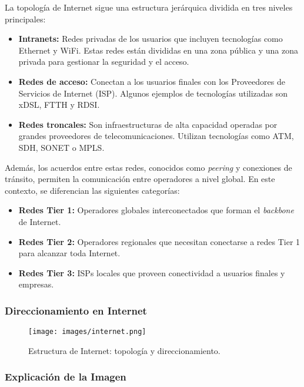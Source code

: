 \documentclass[a4paper,12pt]{article}
\begin{document}
La topología de Internet sigue una estructura jerárquica dividida en tres niveles principales:
\begin{itemize}
    \item \textbf{Intranets:} Redes privadas de los usuarios que incluyen tecnologías como Ethernet y WiFi. Estas redes están divididas en una zona pública y una zona privada para gestionar la seguridad y el acceso.
    \item \textbf{Redes de acceso:} Conectan a los usuarios finales con los Proveedores de Servicios de Internet (ISP). Algunos ejemplos de tecnologías utilizadas son xDSL, FTTH y RDSI.
    \item \textbf{Redes troncales:} Son infraestructuras de alta capacidad operadas por grandes proveedores de telecomunicaciones. Utilizan tecnologías como ATM, SDH, SONET o MPLS.
\end{itemize}

Además, los acuerdos entre estas redes, conocidos como \textit{peering} y conexiones de tránsito, permiten la comunicación entre operadores a nivel global. En este contexto, se diferencian las siguientes categorías:
\begin{itemize}
    \item \textbf{Redes Tier 1:} Operadores globales interconectados que forman el \textit{backbone} de Internet.
    \item \textbf{Redes Tier 2:} Operadores regionales que necesitan conectarse a redes Tier 1 para alcanzar toda Internet.
    \item \textbf{Redes Tier 3:} ISPs locales que proveen conectividad a usuarios finales y empresas.
\end{itemize}

\subsubsection{Direccionamiento en Internet}

\begin{figure}[H]
    \centering
    \texttt{[image: images/internet.png]}
    \caption{Estructura de Internet: topología y direccionamiento.}
    \label{fig:internet-topology-addressing}
\end{figure}


\subsubsection*{Explicación de la Imagen}
\end{document}
